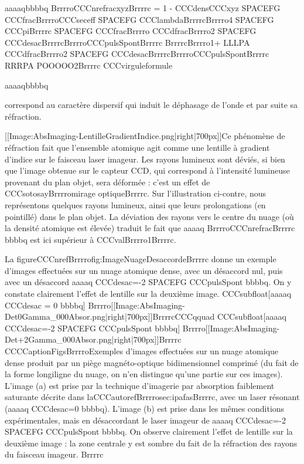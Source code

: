 aaaaqbbbbq
	BrrrroCCCnrefracxyzBrrrrc
= 1 - CCCdensCCCxyz  SPACEFG  CCCfracBrrrroCCCseceff SPACEFG CCClambdaBrrrrcBrrrro4 SPACEFG CCCpiBrrrrc 
 SPACEFG  CCCfracBrrrro CCCdfracBrrrro2 SPACEFG CCCdesacBrrrrcBrrrroCCCpulsSpontBrrrrc BrrrrcBrrrro1+ LLLPA CCCdfracBrrrro2 SPACEFG CCCdesacBrrrrcBrrrroCCCpulsSpontBrrrrc RRRPA POOOOO2Brrrrc
CCCvirguleformule
	
aaaaqbbbbq



correspond au caractère dispersif qui induit le déphasage de l'onde et par suite sa réfraction.
 

 
[[Image:AbsImaging-LentilleGradientIndice.png|right|700px]]Ce phénomène de réfraction fait que l'ensemble atomique agit comme une lentille à gradient d'indice sur le faisceau laser imageur. Les rayons lumineux sont déviés, si bien que l'image obtenue sur le capteur CCD, qui correspond à l'intensité lumineuse provenant du plan objet, sera déformée : c'est un effet de CCCsotosayBrrrromirage optiqueBrrrrc. Sur l'illustration ci-contre, nous représentons quelques rayons lumineux, ainsi que leurs prolongations (en pointillé) dans le plan objet. La déviation des rayons vers le centre du nuage (où la densité atomique est élevée) traduit le fait que aaaaq BrrrroCCCnrefracBrrrrc bbbbq est ici supérieur
à CCCvalBrrrro1Brrrrc.

La figureCCCnrefBrrrrofig:ImageNuageDesaccordeBrrrrc donne un exemple d'images effectuées sur un nuage atomique dense, avec un désaccord nul, puis avec un désaccord aaaaq CCCdesac=-2 SPACEFG CCCpulsSpont bbbbq.
On y constate clairement l'effet de lentille sur la deuxième image.
CCCsubfloat[aaaaq CCCdesac = 0 bbbbq]
Brrrro[[Image:AbsImaging-Det0Gamma_000Absor.png|right|700px]]BrrrrcCCCqquad
CCCsubfloat[aaaaq CCCdesac=-2 SPACEFG CCCpulsSpont bbbbq]
Brrrro[[Image:AbsImaging-Det+2Gamma_000Absor.png|right|700px]]Brrrrc
CCCCaptionFigsBrrrroExemples d'images effectuées sur un nuage atomique dense produit par un piège magnéto-optique bidimensionnel comprimé (du fait de la forme longiligne du nuage, on n'en distingue qu'une partie sur ces images). 
L'image (a) est prise par la technique d'imagerie par absorption faiblement saturante décrite dans laCCCautorefBrrrrosec:ipafasBrrrrc, avec un laser résonant (aaaaq CCCdesac=0 bbbbq). 
L'image (b) est prise dans les mêmes conditions expérimentales, mais en désaccordant le laser imageur de aaaaq CCCdesac=-2 SPACEFG CCCpulsSpont bbbbq.
On observe clairement l'effet de lentille sur la deuxième image : la zone centrale y est sombre du fait de la réfraction des rayons du faisceau imageur.
Brrrrc



